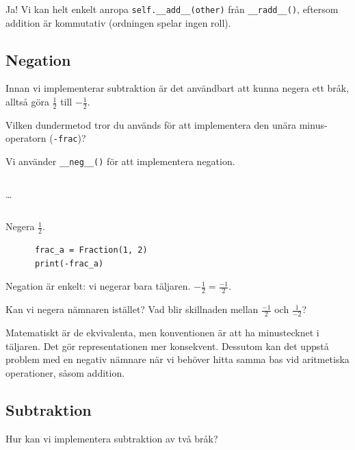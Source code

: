 Ja! Vi kan helt enkelt anropa \texttt{self.__add__(other)} från 
\texttt{__radd__()}, eftersom addition är kommutativ (ordningen 
spelar ingen roll).


\subsection{Negation}

Innan vi implementerar subtraktion är det användbart att kunna negera ett 
bråk, alltså göra \(\frac{1}{2}\) till \(-\frac{1}{2}\).

\begin{exercise}
  Vilken dundermetod tror du används för att implementera den unära 
  minus-operatorn (\texttt{-frac})?
\end{exercise}

Vi använder \texttt{__neg__()} för att implementera negation.

\begin{frame}[fragile]
  \inputminted[linenos,firstline=3,lastline=3]{python}{examples/myfrac_sub.py}
  \dots
  \inputminted[autogobble=false,linenos,firstline=44,lastline=45]{python}{examples/myfrac_sub.py}

  \begin{example}
    Negera \(\frac{1}{2}\).
    \begin{verbatim}
      frac_a = Fraction(1, 2)
      print(-frac_a)
    \end{verbatim}
  \end{example}
\end{frame}

Negation är enkelt: vi negerar bara täljaren. \(-\frac{1}{2} = \frac{-1}{2}\).

\begin{exercise}
  Kan vi negera nämnaren istället? Vad blir skillnaden mellan \(\frac{-1}{2}\) 
  och \(\frac{1}{-2}\)?
\end{exercise}

Matematiskt är de ekvivalenta, men konventionen är att ha minustecknet i 
täljaren. Det gör representationen mer konsekvent.
Dessutom kan det uppstå problem med en negativ nämnare när vi behöver hitta 
samma bas vid aritmetiska operationer, såsom addition.


\subsection{Subtraktion}

\begin{frame}
  \begin{exercise}
    Hur kan vi implementera subtraktion av två bråk?
  \end{exercise}
\end{frame}

